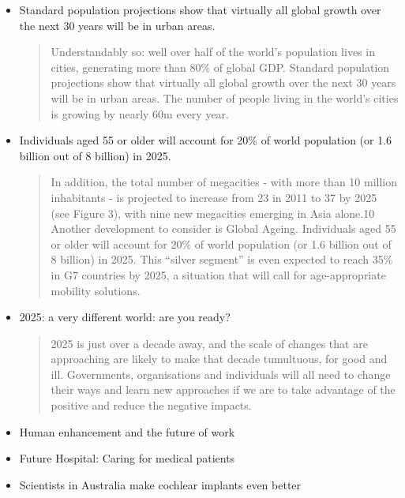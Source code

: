 \begin{itemize}
\begin{quotation}
		The UK Government is committed to grasping this opportunity. Our vision is that by 2050 almost every car and van in the UK will be an ultra low emission vehicle (ULEV), with the UK at the forefront of their design, development and manufacture, making us one of the most attractive locations for ULEV-related inward investment in the world. Context - the inevitable transition 3.\end{quotation}
	\item Standard population projections show that virtually all global growth over the next 30 years will be in urban areas.
	\begin{quotation}
		Understandably so: well over half of the world's population lives in cities, generating more than 80\% of global GDP. Standard population projections show that virtually all global growth over the next 30 years will be in urban areas. The number of people living in the world's cities is growing by nearly 60m every year.\end{quotation}
	\item Individuals aged 55 or older will account for 20\% of world population (or 1.6 billion out of 8 billion) in 2025.	
	\begin{quotation}
		In addition, the total number of megacities - with more than 10 million inhabitants - is projected to increase from 23 in 2011 to 37 by 2025 (see Figure 3), with nine new megacities emerging in Asia alone.10 Another development to consider is Global Ageing. Individuals aged 55 or older will account for 20\% of world population (or 1.6 billion out of 8 billion) in 2025. This ``silver segment'' is even expected to reach 35\% in G7 countries by 2025, a situation that will call for age-appropriate mobility solutions.\end{quotation}
	\item 2025: a very different world: are you ready?
	\begin{quotation}
		2025 is just over a decade away, and the scale of changes that are approaching are likely to make that decade tumultuous, for good and ill. Governments, organisations and individuals will all need to change their ways and learn new approaches if we are to take advantage of the positive and reduce the negative impacts.\end{quotation}
	\item Human enhancement and the future of work
	\item Future Hospital: Caring for medical patients
	\item Scientists in Australia make cochlear implants even better

\end{itemize}
